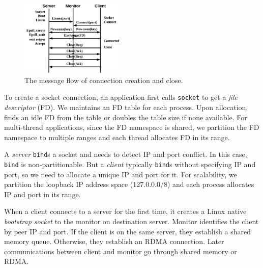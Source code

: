 \begin{figure}[t]
	\centering
	\includegraphics[width=0.45\textwidth]{images/conn-setup}
	\caption{The message flow of connection creation and close.}
	\label{fig:conn-setup}
	\vspace{-15pt}
\end{figure}

To create a socket connection, an application first calls \texttt{socket} to get a \textit{file descriptor} (FD). 
We maintains an FD table for each process. Upon allocation, \libipc{} finds an idle FD from the table or doubles the table size if none available. 
For multi-thread applications, since the FD namespace is shared, we partition the FD namespace to multiple ranges and each thread allocates FD in its range.

A \emph{server} \texttt{bind}s a socket and needs to detect IP and port conflict. In this case, \texttt{bind} is non-partitionable. But a \emph{client} typically \texttt{bind}s without specifying IP and port, so we need to allocate a unique IP and port for it. For scalability, we partition the loopback IP address space (127.0.0.0/8) and each process allocates IP and port in its range.

When a client connects to a server for the first time, it creates a Linux native \textit{bootstrap socket} to the monitor on destination server. Monitor identifies the client by peer IP and port. If the client is on the same server, they establish a shared memory queue. Otherwise, they establish an RDMA connection. Later communications between client and monitor go through shared memory or RDMA.

